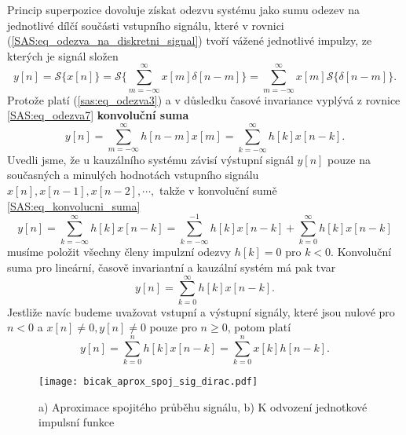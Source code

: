       Princip superpozice dovoluje získat odezvu systému jako sumu odezev na jednotlivé dílčí
      součásti vstupního signálu, které v rovnici (\ref{SAS:eq_odezva_na_diskretni_signal}) tvoří
      vážené jednotlivé impulzy, ze kterých je signál složen
      \begin{equation}\label{SAS:eq_odezva7}
        y[n]=\mathcal{S}\{x[n]\}=\mathcal{S}\{\sum_{m=-\infty}^{\infty}x[m]\delta[n-m]\}
                                =\sum_{m=-\infty}^{\infty}x[m]\mathcal{S}\{\delta[n-m]\}.
      \end{equation}
      Protože platí (\ref{sas:eq_odezva3}) a v důsledku časové invariance vyplývá z rovnice
      \ref{SAS:eq_odezva7} \textbf{konvoluční suma} 
      \begin{equation}\label{SAS:eq_konvolucni_suma}
        y[n]=\sum_{m=-\infty}^{\infty}h[n-m]x[m]=\sum_{k=-\infty}^{\infty}h[k]x[n-k].
      \end{equation}
      Uvedli jsme, že u kauzálního systému závisí výstupní signál $y[n]$ pouze na současných a
      minulých hodnotách vstupního signálu $x[n], x[n-1], x[n-2], \cdots ,$ takže v konvoluční sumě
      \ref{SAS:eq_konvolucni_suma}
      \begin{equation}\label{SAS:eq_konvolucni_suma2}
        y[n]=\sum_{k=-\infty}^{\infty}h[k]x[n-k] 
            =\sum_{k=-\infty}^{-1}h[k]x[n-k] + \sum_{k=0}^{\infty}h[k]x[n-k]
      \end{equation}
      musíme položit všechny členy impulzní odezvy $h[k]=0$ pro $k<0$. Konvoluční suma pro
      lineární, časově invariantní a kauzální systém má pak tvar
      \begin{equation}\label{SAS:eq_konvolucni_suma3}
        y[n]=\sum_{k=0}^{\infty}h[k]x[n-k].
      \end{equation}
      Jestliže navíc budeme uvažovat vstupní a výstupní signály, které jsou nulové pro $n<0$ a
      $x[n]\neq0, y[n]\neq0$ pouze pro $n\geq0$, potom platí
      \begin{equation}\label{SAS:eq_konvolucni_suma4}
        y[n]=\sum_{k=0}^{n}h[k]x[n-k]=\sum_{k=0}^{n}x[k]h[n-k].
      \end{equation}
  
      \begin{figure}[ht!]
        \centering
        \texttt{[image: bicak\_aprox\_spoj\_sig\_dirac.pdf]}
        \caption[Aproximace spojitého průběhu signálu]{a) Aproximace spojitého průběhu signálu, b)
                 K odvození jednotkové impulsní funkce}
        \label{SAS:fig_Bicak_aprox_spoj_fce}
      \end{figure}
  

